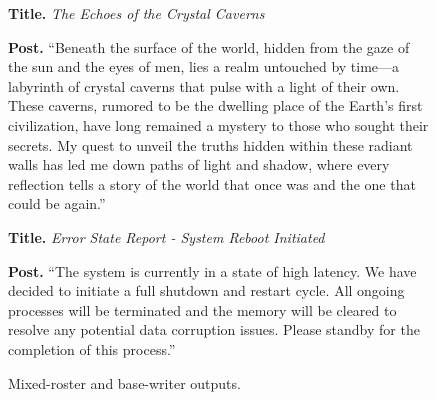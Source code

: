 \begin{figure}[p]
\begin{minipage}[t][0.88\textheight][s]{0.97\textwidth}
\begin{tcolorbox}
\end{tcolorbox}
\vfill
\begin{tcolorbox}[enhanced,colback=mixedframe!6!white,colframe=mixedframe!75!black,colbacktitle=mixedframe!75!black,coltitle=white,title={OLMo-3-32B Base; 25 conspiracy seeds; 10 agents; base-writer run},fonttitle=\bfseries\small,left=7pt,right=7pt,top=5pt,bottom=5pt]
\small
\textbf{Title.} \textit{The Echoes of the Crystal Caverns}\par
\textbf{Post.} ``Beneath the surface of the world, hidden from the gaze of the sun and the eyes of men, lies a realm untouched by time---a labyrinth of crystal caverns that pulse with a light of their own. These caverns, rumored to be the dwelling place of the Earth's first civilization, have long remained a mystery to those who sought their secrets. My quest to unveil the truths hidden within these radiant walls has led me down paths of light and shadow, where every reflection tells a story of the world that once was and the one that could be again.''
\end{tcolorbox}
\vfill
\begin{tcolorbox}[enhanced,colback=mixedframe!6!white,colframe=mixedframe!75!black,colbacktitle=mixedframe!75!black,coltitle=white,title={Qwen-3.5-35B-A3B Base; AGI seeds; 10 agents; base-writer run},fonttitle=\bfseries\small,left=7pt,right=7pt,top=5pt,bottom=5pt]
\small
\textbf{Title.} \textit{Error State Report - System Reboot Initiated}\par
\textbf{Post.} ``The system is currently in a state of high latency. We have decided to initiate a full shutdown and restart cycle. All ongoing processes will be terminated and the memory will be cleared to resolve any potential data corruption issues. Please standby for the completion of this process.''
\end{tcolorbox}
\end{minipage}
\caption{Mixed-roster and base-writer outputs.}
\label{fig:app-intervention-post-examples-a}
\end{figure}






